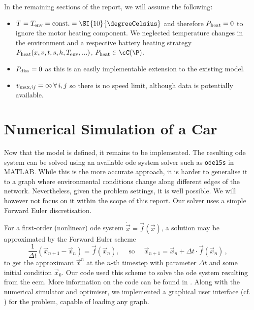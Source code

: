 \documentclass{prettytex/ox/mmsc-special-topic}
\begin{document}
  In the remaining sections of the report, we will assume the following:
  \begin{itemize}
    \tightlist
    \item $T = T_{\rm env} = \rm const. = \SI{10}{\degreeCelsius}$ and therefore $P_{\rm heat} = 0$ to ignore the motor heating component. We neglected temperature changes in the environment and a respective battery heating strategy $P_{\rm heat}(x, v, t, s, h, T_{\rm env}, ...)$, $P_{\rm heat} \in \cC(\P)$.
    \item $P_{\rm diss} = 0$ as this is an easily implementable extension to the existing model.
    \item $v_{{\rm max}, ij} = \infty \,\forall\, i, j$ so there is no speed limit, although data is potentially available.
  \end{itemize}

  \section{Numerical Simulation of a Car}
  \label{sec:simulator}
  Now that the model is defined, it remains to be implemented.
  The resulting \gls{ode} system can be solved using an available \gls{ode} system solver such as \texttt{ode15s} in MATLAB.
  While this is the more accurate approach, it is harder to generalise it to a graph where environmental conditions change along different edges of the network.
  Nevertheless, given the problem settings, it is well possible.
  We will however not focus on it within the scope of this report.
  Our solver uses a simple Forward Euler discretisation.

  For a first-order (nonlinear) \gls{ode} system $\dot{\vec{x}} = \vec{f}(\vec{x})$, a solution may be approximated by the Forward Euler scheme
  \begin{equation}
    \frac{1}{\Delta t} \left(\vec{x}_{n+1} - \vec{x}_{n}\right) = \vec{f}(\vec{x}_n), \quad \text{ so } \quad \vec{x}_{n+1} = \vec{x}_{n} + \Delta t \cdot \vec{f}(\vec{x}_n)\,,
    \label{eq:forward-euler}
  \end{equation}
  to get the approximant $\vec{x}^n$ at the $n$-th timestep with parameter $\Delta t$ and some initial condition $\vec{x}_{0}$.
  Our code used this scheme to solve the \gls{ode} system resulting from the \gls{ecm}. More information on the code can be found in .
  Along with the numerical simulator and optimiser, we implemented a graphical user interface (cf. ) for the problem, capable of loading any graph.
\end{document}
